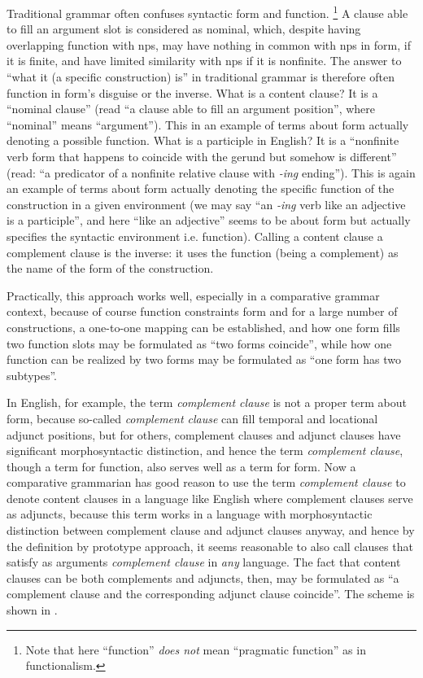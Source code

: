 \documentclass{article}
\newcommand*{\term}[1]{\emph{#1}}
\newcommand*{\corpus}[1]{\emph{#1}}
\begin{document}
Traditional grammar often confuses syntactic form and function.%
\footnote{Note that here ``function'' \emph{does not} mean ``pragmatic function'' as in functionalism.}
A clause able to fill an argument slot is considered as nominal,
which, despite having overlapping function with \ac{np}s,
may have nothing in common with \ac{np}s in form, if it is finite,
and have limited similarity with \ac{np}s if it is nonfinite.
The answer to ``what it (a specific construction) is'' in traditional grammar 
is therefore often function in form's disguise or the inverse.
What is a content clause? 
It is a ``nominal clause'' (read ``a clause able to fill an argument position'', 
where ``nominal'' means ``argument'').
This in an example of terms about form actually denoting a possible function. 
What is a participle in English?
It is a ``nonfinite verb form that happens to coincide with the gerund
but somehow is different'' 
(read: ``a predicator of a nonfinite relative clause with \corpus{-ing} ending'').
This is again an example of terms about form 
actually denoting the specific function of the construction in a given environment 
(we may say ``an \corpus{-ing} verb like an adjective is a participle'',
and here ``like an adjective'' seems to be about form 
but actually specifies the syntactic environment i.e. function).
Calling a content clause a complement clause is the inverse:
it uses the function (being a complement) as the name of the form of the construction.

Practically, this approach works well, especially in a comparative grammar context,
because of course function constraints form and for a large number of constructions,
a one-to-one mapping can be established,
and how one form fills two function slots may be formulated as ``two forms coincide'',
while how one function can be realized by two forms may be formulated as ``one form has two subtypes''.

In English, for example, the term \term{complement clause} is not a proper term about form,
because so-called \term{complement clause} can fill temporal and locational adjunct positions,
but for others, complement clauses and adjunct clauses have significant morphosyntactic distinction,
and hence the term \term{complement clause}, though a term for function,
also serves well as a term for form.
Now a comparative grammarian has good reason to use the term \term{complement clause}
to denote content clauses
in a language like English where complement clauses serve as adjuncts,
because this term works in a language 
with morphosyntactic distinction between complement clause and adjunct clauses anyway,
and hence by the definition by prototype approach,
it seems reasonable to also call clauses that satisfy as arguments
\term{complement clause} in \emph{any} language.
The fact that content clauses can be both complements and adjuncts, then,
may be formulated as ``a complement clause and the corresponding adjunct clause coincide''.
The scheme is shown in .
\end{document}

